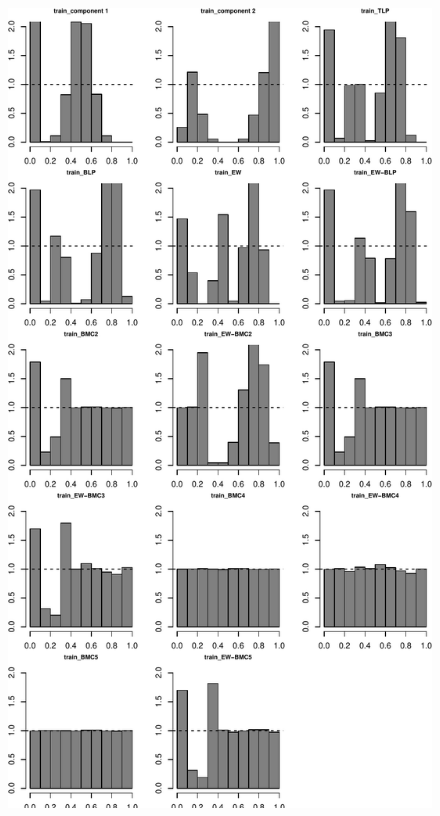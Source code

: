 \documentclass[
]{article}
\begin{document}
\begin{figure}[h]

{\centering \includegraphics{applied_blp_sim_files/figure-latex/unnamed-chunk-19-1} 

}

\end{figure}

\clearpage
\end{document}
